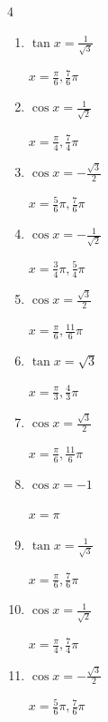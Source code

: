 \begin{multicols}{4}
\begin{enumerate}
  \item $\displaystyle \tan{x}  = \frac{1}{\sqrt{3}}$

        $\displaystyle x = \frac{\pi}{6} , \frac{7}{6}\pi$

  \item $\displaystyle \cos{x}  = \frac{1}{\sqrt{2}}$

        $\displaystyle x = \frac{\pi}{4} , \frac{7}{4}\pi$

  \item $\displaystyle \cos{x}  = -\frac{\sqrt{3}}{2}$

        $\displaystyle x = \frac{5}{6}\pi , \frac{7}{6}\pi$

\columnbreak %

  \item $\displaystyle \cos{x}  = -\frac{1}{\sqrt{2}}$

        $\displaystyle x = \frac{3}{4}\pi , \frac{5}{4}\pi$

  \item $\displaystyle \cos{x}  = \frac{\sqrt{3}}{2}$

        $\displaystyle x = \frac{\pi}{6} , \frac{11}{6}\pi$

  \item $\displaystyle \tan{x}  = \sqrt{3}$

        $\displaystyle x = \frac{\pi}{3} , \frac{4}{3}\pi$

  \item $\displaystyle \cos{x}  = \frac{\sqrt{3}}{2}$

        $\displaystyle x = \frac{\pi}{6} , \frac{11}{6}\pi$

  \item $\displaystyle \cos{x}  = -1$

        $\displaystyle x = \pi$

  \item $\displaystyle \tan{x}  = \frac{1}{\sqrt{3}}$

        $\displaystyle x = \frac{\pi}{6} , \frac{7}{6}\pi$

  \item $\displaystyle \cos{x}  = \frac{1}{\sqrt{2}}$

        $\displaystyle x = \frac{\pi}{4} , \frac{7}{4}\pi$

  \item $\displaystyle \cos{x}  = -\frac{\sqrt{3}}{2}$

        $\displaystyle x = \frac{5}{6}\pi , \frac{7}{6}\pi$


\end{enumerate}
\end{multicols}
